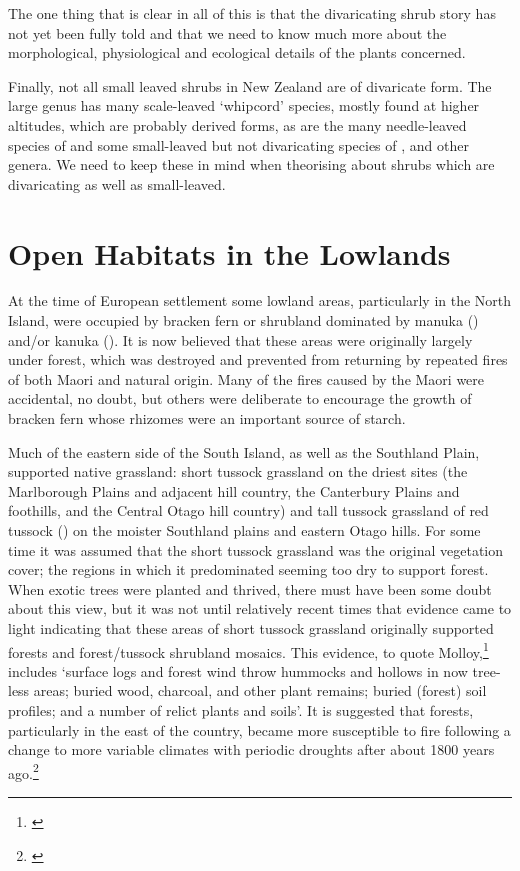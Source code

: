 The one thing that is clear in all of this is that the divaricating shrub story has not yet been fully told and that we need to know much more about the morphological, physiological and ecological details of the plants concerned.

Finally, not all small leaved shrubs in New Zealand are of divaricate form.
The large genus  has many scale-leaved `whipcord' species, mostly found at higher altitudes, which are probably derived forms, as are the many needle-leaved species of  and some small-leaved but not divaricating species of ,  and other genera.
We need to keep these in mind when theorising about shrubs which are divaricating as well as small-leaved.

\chapter{Open Habitats in the Lowlands}
\label{ch:openhabitats}

At the time of European settlement some lowland areas, particularly in the North Island, were occupied by bracken fern or shrubland dominated by manuka () and/or kanuka ().
It is now believed that these areas were originally largely under forest, which was destroyed and prevented from returning by repeated fires of both Maori and natural origin.
Many of the fires caused by the Maori were accidental, no doubt, but others were deliberate to encourage the growth of bracken fern whose rhizomes were an important source of starch.

Much of the eastern side of the South Island, as well as the Southland Plain, supported native grassland: short tussock grassland on the driest sites (the Marlborough Plains and adjacent hill country, the Canterbury Plains and foothills, and the Central Otago hill country) and tall tussock grassland of red tussock () on the moister Southland plains and eastern Otago hills.
For some time it was assumed that the short tussock grassland was the original vegetation cover; the regions in which it predominated seeming too dry to support forest.
When exotic trees were planted and thrived, there must have been some doubt about this view, but it was not until relatively recent times that evidence came to light indicating that these areas of short tussock grassland originally supported forests and forest/tussock shrubland mosaics.
This evidence, to quote Molloy,\footnote{\cite{molloybpj1963distribution}} includes `surface logs and forest wind throw hummocks and hollows in now tree-less areas; buried wood, charcoal, and other plant remains; buried (forest) soil profiles; and a number of relict plants and soils'.
It is suggested that forests, particularly in the east of the country, became more susceptible to fire following a change to more variable climates with periodic droughts after about 1800 years ago.\footnote{\cite{mcglone1977ascarina}}

